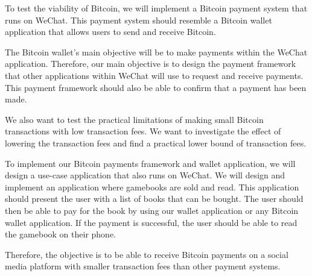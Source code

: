 To test the viability of Bitcoin, we will implement a Bitcoin payment system that runs on WeChat. This payment system should resemble a Bitcoin wallet application that allows users to send and receive Bitcoin. 

The Bitcoin wallet's main objective will be to make payments within the WeChat application. Therefore, our main objective is to design the payment framework that other applications within WeChat will use to request and receive payments. This payment framework should also be able to confirm that a payment has been made. 

We also want to test the practical limitations of making small Bitcoin transactions with low transaction fees. We want to investigate the effect of lowering the transaction fees and find a practical lower bound of transaction fees.

To implement our Bitcoin payments framework and wallet application, we will design a use-case application that also runs on WeChat. We will design and implement an application where gamebooks are sold and read. This application should present the user with a list of books that can be bought. The user should then be able to pay for the book by using our wallet application or any Bitcoin wallet application. If the payment is successful, the user should be able to read the gamebook on their phone.

Therefore, the objective is to be able to receive Bitcoin payments on a social media platform with smaller transaction fees than other payment systems.




